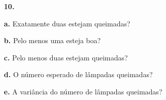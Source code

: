\begin{itemize}
	\item[\textbf{10.}] 
	    \item[\textbf{a.}] Exatamente duas estejam queimadas?
	    \item[\textbf{b.}] Pelo menos uma esteja boa? \item[\textbf{c.}] Pelo menos duas estejam queimadas?
	    \item[\textbf{d.}] O número esperado de lâmpadas queimadas? \item[\textbf{e.}] A variância do número de lâmpadas queimadas?
	
\end{itemize}